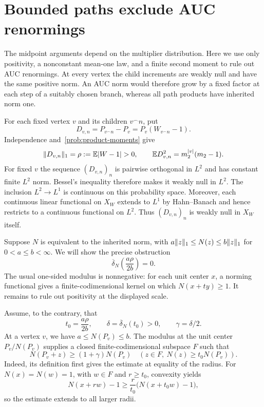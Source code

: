 \section{Bounded paths exclude AUC renormings}\label{sec:obstruction}
The midpoint arguments depend on the multiplier distribution. Here we
use only positivity, a nonconstant mean-one law, and a finite second moment
to rule out AUC renormings. At every vertex the child increments are
weakly null and have the same positive norm. An AUC norm would therefore
grow by a fixed factor at each step of a suitably chosen branch, whereas
all path products have inherited norm one.

For each fixed vertex $v$ and its children $v^\frown n$, put
\[
 D_{v,n}=P_{v^\frown n}-P_v=P_v(W_{v^\frown n}-1).
\]
Independence and~\eqref{prob:product-moments} give
\begin{equation}\label{prob:child-moments}
 \norm{D_{v,n}}=\rho:=\E|W-1|>0,\qquad
 \E D_{v,n}^2=m_2^{|v|}(m_2-1).
\end{equation}
For fixed $v$ the sequence $(D_{v,n})_n$ is pairwise orthogonal in $L^2$
and has constant finite $L^2$ norm.  Bessel's inequality therefore makes
it weakly null in $L^2$.  The inclusion $L^2\longrightarrow L^1$ is
continuous on this probability space.  Moreover, each continuous linear
functional on $X_W$ extends to $L^1$ by Hahn--Banach and hence restricts
to a continuous functional on $L^2$.  Thus $(D_{v,n})_n$ is weakly null
in $X_W$ itself.

Suppose $N$ is equivalent to the inherited norm, with
$a\lVert z\rVert_1\le N(z)\le b\lVert z\rVert_1$ for $0<a\le b<\infty$.
We will show the precise obstruction
\begin{equation}\label{eq:auc-zero}
 \overline\delta_N\left(\frac{a\rho}{2b}\right)=0.
\end{equation}
The usual one-sided modulus is nonnegative: for each unit center $x$, a
norming functional gives a finite-codimensional kernel on which
$N(x+ty)\ge1$. It remains to rule out positivity at the displayed scale.

Assume, to the contrary, that
\[
 t_0=\frac{a\rho}{2b},\qquad
 \delta=\overline\delta_N(t_0)>0,\qquad \gamma=\delta/2.
\]
At a vertex $v$, we have $a\le N(P_v)\le b$. The modulus at the unit center
$P_v/N(P_v)$ supplies a closed finite-codimensional subspace $F$ such that
\[
 N(P_v+z)\ge(1+\gamma)N(P_v)
 \quad(z\in F,\ N(z)\ge t_0N(P_v)).
\]
Indeed, its definition first gives the estimate at equality of the radius.
For $N(x)=N(w)=1$, with $w\in F$ and $r\ge t_0$, convexity yields
\[
 N(x+rw)-1\ge\frac r{t_0}\bigl(N(x+t_0w)-1\bigr),
\]
so the estimate extends to all larger radii.

